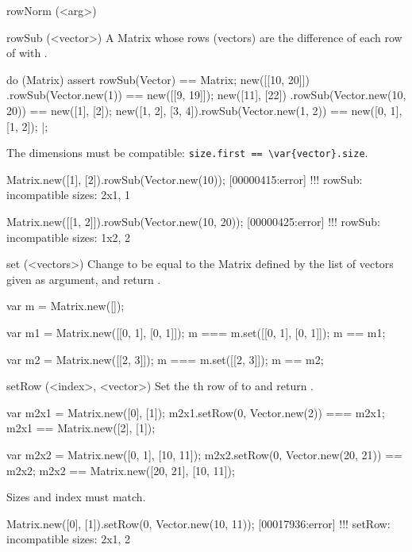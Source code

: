 \begin{urbiscriptapi}
\item[rowNorm](<arg>)%
\begin{urbiassert}

\end{urbiassert}

\item[rowSub](<vector>)%
  A Matrix whose rows (vectors) are the difference of each row of \this with
  .
\begin{urbiscript}
do (Matrix)
{
  assert
  {
    rowSub(Vector) == Matrix;
    new([[10, 20]])    .rowSub(Vector.new(1))      == new([[9, 19]]);
    new([11], [22])    .rowSub(Vector.new(10, 20)) == new([1], [2]);
    new([1, 2], [3, 4]).rowSub(Vector.new(1, 2))   == new([0, 1], [1, 2]);
  }
}|;
\end{urbiscript}

  The dimensions must be compatible:
  \lstinline|size.first == \var{vector}.size|.
\begin{urbiscript}
Matrix.new([1], [2]).rowSub(Vector.new(10));
[00000415:error] !!! rowSub: incompatible sizes: 2x1, 1

Matrix.new([[1, 2]]).rowSub(Vector.new(10, 20));
[00000425:error] !!! rowSub: incompatible sizes: 1x2, 2
\end{urbiscript}


\item[set](<vectors>)%
  Change \this to be equal to the Matrix defined by the list of vectors
  given as argument, and return \this.
\begin{urbiassert}
var m = Matrix.new([]);

var m1 = Matrix.new([[0, 1], [0, 1]]);
    m  ===    m.set([[0, 1], [0, 1]]);
    m  == m1;

var m2 = Matrix.new([[2, 3]]);
    m  ===    m.set([[2, 3]]);
    m  == m2;
\end{urbiassert}

\item[setRow](<index>, <vector>)%
  Set the th row of \this to  and return \this.
\begin{urbiassert}
var m2x1 = Matrix.new([0], [1]);
m2x1.setRow(0, Vector.new(2)) === m2x1;
m2x1 == Matrix.new([2], [1]);

var m2x2 = Matrix.new([0, 1], [10, 11]);
m2x2.setRow(0, Vector.new(20, 21)) == m2x2;
m2x2 == Matrix.new([20, 21], [10, 11]);
\end{urbiassert}

  Sizes and index must match.
\begin{urbiscript}
Matrix.new([0], [1]).setRow(0, Vector.new(10, 11));
[00017936:error] !!! setRow: incompatible sizes: 2x1, 2


\end{urbiscript}
\end{urbiscriptapi}
